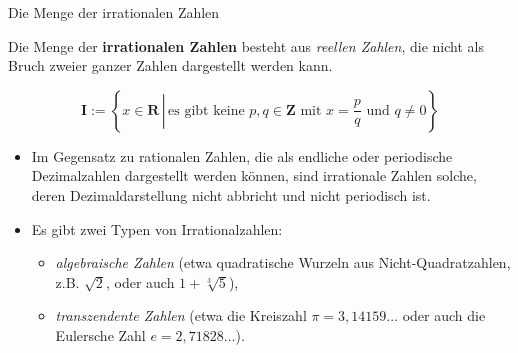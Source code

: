 \documentclass[12pt,ngerman,a4paper,ignorenonframetext,]{beamer}
\providecommand{\tightlist}{%
  \setlength{\itemsep}{0pt}\setlength{\parskip}{0pt}}
\begin{document}
\begin{frame}{Die Menge der irrationalen Zahlen}
\protect\hypertarget{die-menge-der-irrationalen-zahlen}{}

Die Menge der \textbf{irrationalen Zahlen} besteht aus \emph{reellen
Zahlen}, die nicht als Bruch zweier ganzer Zahlen dargestellt werden
kann.

\begin{equation*}
    \mathbf{I} := \left\{ x \in \mathbf{R}\, \left|\, \text{es gibt keine } p, q \in\mathbf{Z} \text{ mit } x = \frac{p}{q} \text{ und } q \neq 0 \right. \right\}
\end{equation*}


\begin{Bemerkungen}[]

\begin{itemize}
\item
  Im Gegensatz zu rationalen Zahlen, die als endliche oder periodische
  Dezimalzahlen dargestellt werden können, sind irrationale Zahlen
  solche, deren Dezimaldarstellung nicht abbricht und nicht periodisch
  ist.
\item
  Es gibt zwei Typen von Irrationalzahlen:

  \begin{itemize}
  \tightlist
  \item
    \emph{algebraische Zahlen} (etwa quadratische Wurzeln aus
    Nicht-Quadratzahlen, \mbox{z.\thinspace{}B.}\xspace{} \(\sqrt{2}\),
    oder auch \(1+\sqrt[3]{5}\)),
  \item
    \emph{transzendente Zahlen} (etwa die Kreiszahl
    \(\pi = 3{,}14159\dots\) oder auch die Eulersche Zahl
    \(e = 2{,}71828\dots\)).
  \end{itemize}
\end{itemize}

\end{Bemerkungen}

\end{frame}
\end{document}

